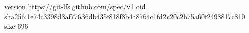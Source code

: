 version https://git-lfs.github.com/spec/v1
oid sha256:1e74c3398d3af77636db435f818f8b4a8764c1fd2c20c2b75a60f2498817c810
size 696
